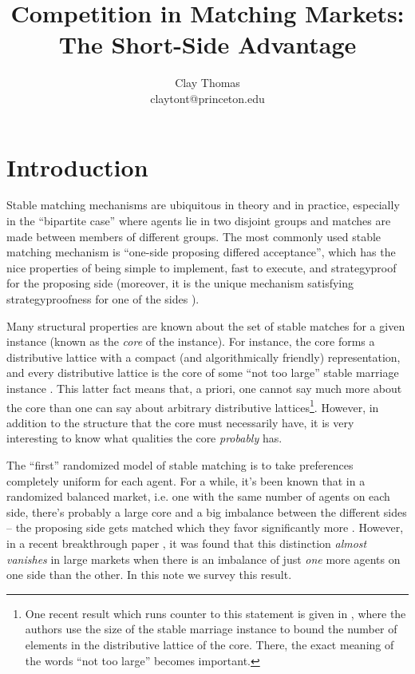 \documentclass[12pt]{article}
\begin{document}
 
\title{Competition in Matching Markets:\\
The Short-Side Advantage}
\author{Clay Thomas\\
claytont@princeton.edu}
\maketitle

\section{Introduction}

  Stable matching mechanisms are ubiquitous in theory and in practice,
  especially in the ``bipartite case'' where agents lie in two disjoint groups
  and matches are made between members of different groups.
  The most commonly used stable matching mechanism is ``one-side proposing
  differed acceptance'', which has the nice properties of being simple to
  implement, fast to execute, and strategyproof for the proposing side
  \cite{DubinsMachiavelliGaleShapley81}
  (moreover, it is the unique mechanism satisfying strategyproofness for 
  one of the sides \cite{GaleMsMachiavelli85}).

  Many structural properties are known about the set of stable matches for a
  given instance (known as the \emph{core} of the instance).
  For instance, the core forms a distributive lattice with a compact
  (and algorithmically friendly) representation,
  and every distributive lattice is the core of some ``not too large''
  stable marriage instance \cite{IrvingCountingStable86}.
  This latter fact means that, a priori, one cannot say much more
  about the core than one can say about arbitrary distributive
  lattices\footnote{
    One recent result which runs counter to this statement is given in
    \cite{KarlinExpUBNumberStable18}, where the authors use the 
    size of the stable marriage instance to
    bound the number of elements in the distributive lattice of the core.
    There, the exact meaning of the words ``not too large'' becomes important.
  }. However, in addition to the structure that the core must necessarily have,
  it is very interesting to know what qualities the core \emph{probably} has.

  The ``first'' randomized model of stable matching is to take preferences
  completely uniform for each agent.
  For a while, it's been known that in a randomized balanced market,
  i.e. one with the same
  number of agents on each side, there's probably a large core
  and a big imbalance between the different sides -- the proposing side gets
  matched which they favor significantly more \cite{PittelAverageStable89}.
  However, in a recent breakthrough paper \cite{AshlagiUnbalancedCompetition17},
  it was found that this distinction
  \emph{almost vanishes} in large markets when there is an imbalance of just
  \emph{one} more agents on one side than the other.
  In this note we survey this result.
\end{document}

